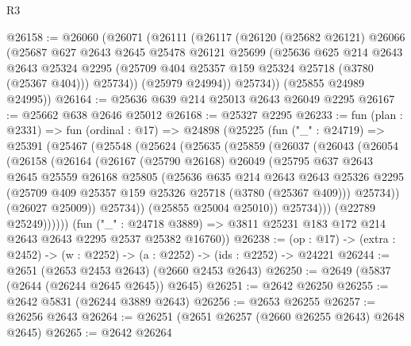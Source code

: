 \begin{lexlean}{R3}
\begin{coremodule}
@26158 := @26060
    (@26071
      (@26111
        (@26117
          (@26120
            (@25682 @26121)
            @26066
            (@25687
              @627
              @2643
              @2645
              @25478
              @26121
              @25699
              (@25636
                @625
                @214
                @2643
                @2643
                @25324
                @2295
                (@25709 @404 @25357 @159 @25324 @25718 (@3780 (@25367 @404)))
                @25734))
            (@25979 @24994))
          @25734))
      (@25855 @24989 @24995))
@26164 := @25636 @639 @214 @25013 @2643 @26049 @2295
@26167 := @25662 @638 @2646 @25012
@26168 := @25327 @2295
@26233 := fun (plan : @2331) =>
  fun (ordinal : @17) =>
  @24898
    (@25225
      (fun ("_" : @24719) =>
      @25391
        (@25467
          (@25548
            (@25624
              (@25635
                (@25859
                  (@26037
                    (@26043
                      (@26054
                        (@26158
                          (@26164
                            (@26167
                              (@25790 @26168)
                              @26049
                              (@25795
                                @637
                                @2643
                                @2645
                                @25559
                                @26168
                                @25805
                                (@25636
                                  @635
                                  @214
                                  @2643
                                  @2643
                                  @25326
                                  @2295
                                  (@25709 @409 @25357 @159 @25326 @25718 (@3780 (@25367 @409)))
                                  @25734))
                              (@26027 @25009))
                            @25734))
                        (@25855 @25004 @25010))
                      @25734)))
                (@22789 @25249))))))
      (fun ("_" : @24718 @3889) =>
      @3811 @25231 @183 @172 @214 @2643 @2643 @2295 @2537 @25382 @16760))
@26238 := (op : @17) -> (extra : @2452) -> (w : @2252) -> (a : @2252) -> (ids : @2252) -> @24221
@26244 := @2651 (@2653 @2453 @2643) (@2660 @2453 @2643)
@26250 := @2649 (@5837 (@2644 (@26244 @2645 @2645)) @2645)
@26251 := @2642 @26250
@26255 := @2642 @5831 (@26244 @3889 @2643)
@26256 := @2653 @26255
@26257 := @26256 @2643
@26264 := @26251 (@2651 @26257 (@2660 @26255 @2643) @2648 @2645)
@26265 := @2642 @26264

\end{coremodule}
\end{lexlean}
